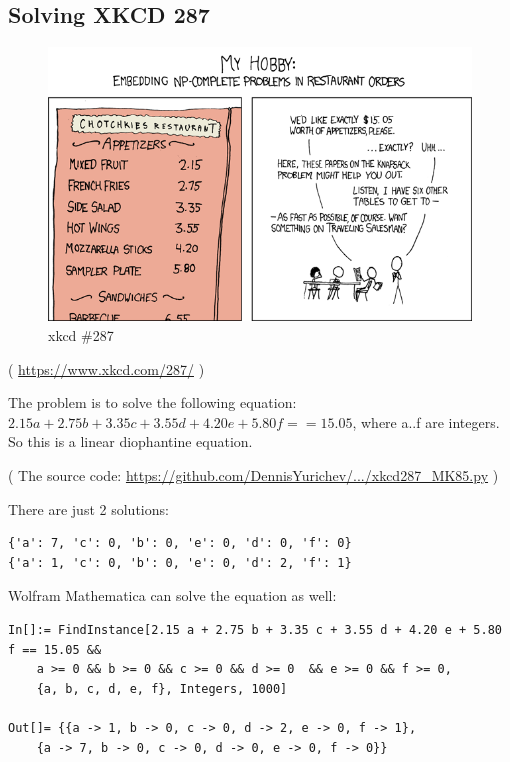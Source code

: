 \subsection{Solving XKCD 287}
\label{XkcdILP}

\begin{figure}[H]
\centering
\includegraphics[scale=7]{equations/xkcd287/np_complete.png}
\caption{xkcd \#287}
\end{figure}

( \url{https://www.xkcd.com/287/} )

The problem is to solve the following equation:
$2.15a + 2.75b + 3.35c + 3.55d + 4.20e + 5.80f == 15.05$,
where a..f are integers.
So this is a linear diophantine equation.



( The source code: \url{https://github.com/DennisYurichev/.../xkcd287_MK85.py} )

There are just 2 solutions:

\begin{lstlisting}
{'a': 7, 'c': 0, 'b': 0, 'e': 0, 'd': 0, 'f': 0}
{'a': 1, 'c': 0, 'b': 0, 'e': 0, 'd': 2, 'f': 1}
\end{lstlisting}

Wolfram Mathematica can solve the equation as well:

\begin{lstlisting}
In[]:= FindInstance[2.15 a + 2.75 b + 3.35 c + 3.55 d + 4.20 e + 5.80 f == 15.05 && 
	a >= 0 && b >= 0 && c >= 0 && d >= 0  && e >= 0 && f >= 0, 
	{a, b, c, d, e, f}, Integers, 1000]

Out[]= {{a -> 1, b -> 0, c -> 0, d -> 2, e -> 0, f -> 1},
	{a -> 7, b -> 0, c -> 0, d -> 0, e -> 0, f -> 0}}
\end{lstlisting}

